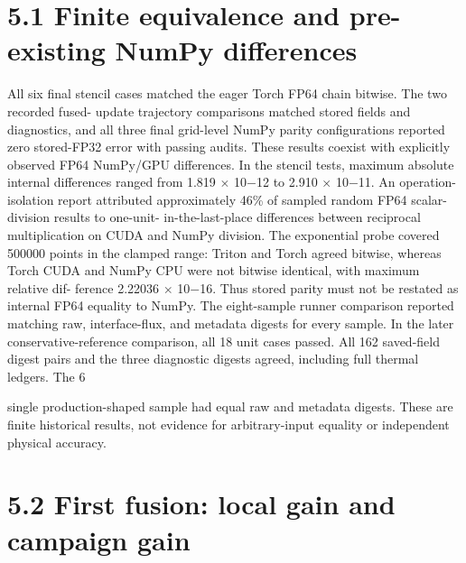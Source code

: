 \documentclass[11pt]{article}
\begin{document}
\section*{5.1 Finite equivalence and pre-existing NumPy differences}

All six final stencil cases matched the eager Torch FP64 chain bitwise. The two recorded fused-
update trajectory comparisons matched stored fields and diagnostics, and all three final grid-level
NumPy parity configurations reported zero stored-FP32 error with passing audits. These results
coexist with explicitly observed FP64 NumPy/GPU differences. In the stencil tests, maximum
absolute internal differences ranged from 1.819 \ensuremath{\times} 10\ensuremath{-}12 to 2.910 \ensuremath{\times} 10\ensuremath{-}11. An operation-isolation
report attributed approximately 46\% of sampled random FP64 scalar-division results to one-unit-
in-the-last-place differences between reciprocal multiplication on CUDA and NumPy division. The
exponential probe covered 500000 points in the clamped range: Triton and Torch agreed bitwise,
whereas Torch CUDA and NumPy CPU were not bitwise identical, with maximum relative dif-
ference 2.22036 \ensuremath{\times} 10\ensuremath{-}16. Thus stored parity must not be restated as internal FP64 equality to
NumPy.
The eight-sample runner comparison reported matching raw, interface-flux, and metadata digests
for every sample. In the later conservative-reference comparison, all 18 unit cases passed. All 162
saved-field digest pairs and the three diagnostic digests agreed, including full thermal ledgers. The
6

single production-shaped sample had equal raw and metadata digests. These are finite historical
results, not evidence for arbitrary-input equality or independent physical accuracy.

\section*{5.2 First fusion: local gain and campaign gain}
\end{document}
